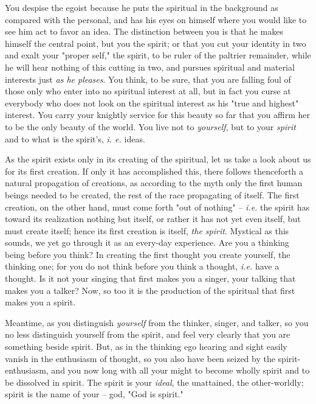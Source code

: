 You despise the egoist because he puts the spiritual in the background as 
compared with the personal, and has his eyes on himself where you would like 
to see him act to favor an idea. The distinction between you is that he makes 
himself the central point, but you the spirit; or that you cut your identity 
in two and exalt your "{}proper self,"{} the spirit, to be ruler of the 
paltrier remainder, while he will hear nothing of this cutting in two, and 
pursues spiritual and material interests just \textit{as he pleases}. You 
think, to be sure, that you are falling foul of those only who enter into no 
spiritual interest at all, but in fact you curse at everybody who does not 
look on the spiritual interest as his "{}true and highest"{} interest. You 
carry your knightly service for this beauty so far that you affirm her to be 
the only beauty of the world. You live not to \textit{yourself}, but to your 
\textit{spirit} and to what is the spirit's, \textit{i. e.} ideas.

As the spirit exists only in its creating of the spiritual, let us take a look 
about us for its first creation. If only it has accomplished this, there 
follows thenceforth a natural propagation of creations, as according to the 
myth only the first human beings needed to be created, the rest of the race 
propagating of itself. The first creation, on the other hand, must come forth 
"{}out of nothing"{} -- \textit{i.e.} the spirit has toward its realization 
nothing but itself, or rather it has not yet even itself, but must create 
itself; hence its first creation is itself, \textit{the spirit}. Mystical as 
this sounds, we yet go through it as an every-day experience. Are you a 
thinking being before you think? In creating the first thought you create 
yourself, the thinking one; for you do not think before you think a thought, 
\textit{i.e.} have a thought. Is it not your singing that first makes you a 
singer, your talking that makes you a talker? Now, so too it is the production 
of the spiritual that first makes you a spirit.

Meantime, as you distinguish \textit{yourself} from the thinker, singer, and 
talker, so you no less distinguish yourself from the spirit, and feel very 
clearly that you are something beside spirit. But, as in the thinking ego 
hearing and sight easily vanish in the enthusiasm of thought, so you also have 
been seized by the spirit-enthusiasm, and you now long with all your might to 
become wholly spirit and to be dissolved in spirit. The spirit is your 
\textit{ideal}, the unattained, the other-worldly; spirit is the name of your 
-- god, "{}God is spirit."{}

